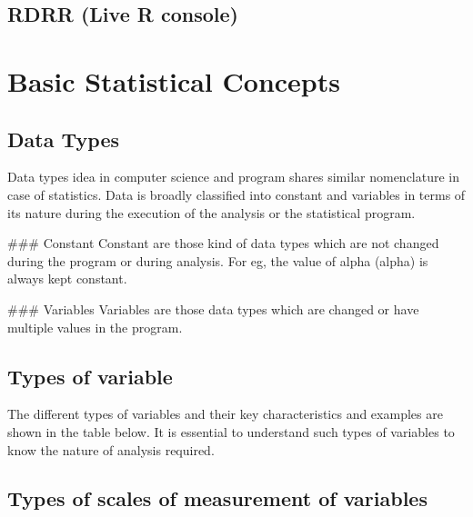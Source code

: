 \documentclass[
]{book}
\begin{document}
\hypertarget{rdrr-live-r-console}{%
\section{RDRR (Live R console)}\label{rdrr-live-r-console}}

\hypertarget{basic-statistical-concepts}{%
\chapter{Basic Statistical Concepts}\label{basic-statistical-concepts}}

\hypertarget{data-types}{%
\section{Data Types}\label{data-types}}

Data types idea in computer science and program shares similar nomenclature in case of statistics. Data is broadly classified into constant and variables in terms of its nature during the execution of the analysis or the statistical program.

\#\#\# Constant Constant are those kind of data types which are not changed during the program or during analysis. For eg, the value of alpha (alpha) is always kept constant.

\#\#\# Variables Variables are those data types which are changed or have multiple values in the program.

\hypertarget{types-of-variable}{%
\section{Types of variable}\label{types-of-variable}}

The different types of variables and their key characteristics and examples are shown in the table below. It is essential to understand such types of variables to know the nature of analysis required.

\hypertarget{types-of-scales-of-measurement-of-variables}{%
\section{Types of scales of measurement of variables}\label{types-of-scales-of-measurement-of-variables}}
\end{document}
